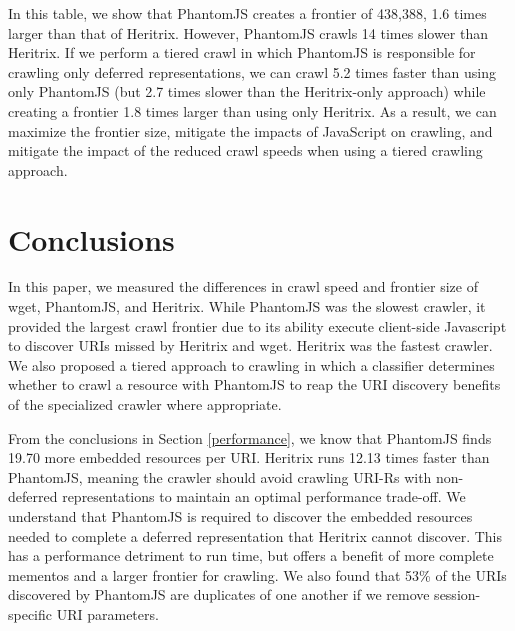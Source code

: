 \documentclass{sig-alternate}
\begin{document}

In this table, we show that PhantomJS creates a frontier of 438,388, 1.6 times larger than that of Heritrix. However, PhantomJS crawls 14 times slower than Heritrix. If we perform a tiered crawl in which PhantomJS is responsible for crawling only deferred representations, we can crawl 5.2 times faster than using only PhantomJS (but 2.7 times slower than the Heritrix-only approach) while creating a frontier 1.8 times larger than using only Heritrix. As a result, we can maximize the frontier size, mitigate the impacts of JavaScript on crawling, and mitigate the impact of the reduced crawl speeds when using a tiered crawling approach.

\section{Conclusions}
\label{conclusion}

In this paper, we measured the differences in crawl speed and frontier size of wget, PhantomJS, and Heritrix. While PhantomJS was the slowest crawler, it provided the largest crawl frontier due to its ability execute client-side Javascript to discover URIs missed by Heritrix and wget. Heritrix was the fastest crawler. We also proposed a tiered approach to crawling in which a classifier determines whether to crawl a resource with PhantomJS to reap the URI discovery benefits of the specialized crawler where appropriate.

From the conclusions in Section \ref{performance}, we know that PhantomJS finds 19.70 more embedded resources per URI. Heritrix runs 12.13 times faster than PhantomJS, meaning the crawler should avoid crawling URI-Rs with non-deferred representations to maintain an optimal performance trade-off. We understand that PhantomJS is required to discover the embedded resources needed to complete a deferred representation that Heritrix cannot discover. This has a performance detriment to run time, but offers a benefit of more complete mementos and a larger frontier for crawling. We also found that 53\% of the URIs discovered by PhantomJS are duplicates of one another if we remove session-specific URI parameters. 
\end{document}
